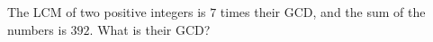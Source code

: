 The LCM of two positive integers is $7$ times their GCD, and the sum of the numbers is $392$. What is their GCD?
